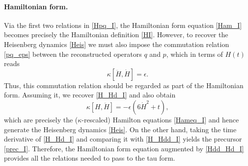 \documentclass[12pt,a4paper]{article}
\numberwithin{equation}{section}
\begin{document}
\paragraph{Hamiltonian form.}
Via the first two relations in \eqref{Hpq_I}, the Hamiltonian form equation \eqref{Ham_I} becomes precisely the Hamiltonian definition \eqref{HI}.
However, to recover the Heisenberg dynamics \eqref{Heis} we must also impose the commutation relation \eqref{pq_eps} between the reconstructed operators $q$ and $p$, which in terms of $H(t)$ reads
\begin{equation}\label{Hdd_Hd_I}
\kappa[\ddot{H},\dot{H}]=\epsilon. 
\end{equation}
Thus, this commutation relation should be regarded as part of the Hamiltonian form. Assuming it, we recover \eqref{H_Hd_I} and also obtain
\begin{equation}\label{H_Hdd_I}
\kappa[H,\ddot{H}]=-\epsilon(6\dot{H}^2+t), 
\end{equation}
which are precisely the ($\kappa$-rescaled) Hamilton equations \eqref{Hameq_I} and hence generate the Heisenberg dynamics \eqref{Heis}. On the other hand, taking the time derivative of \eqref{H_Hd_I} and comparing it with \eqref{H_Hdd_I} yields the precursor \eqref{prec_I}. Therefore, the Hamiltonian form equation augmented by \eqref{Hdd_Hd_I} provides all the relations needed to pass to the tau form.
\end{document}
